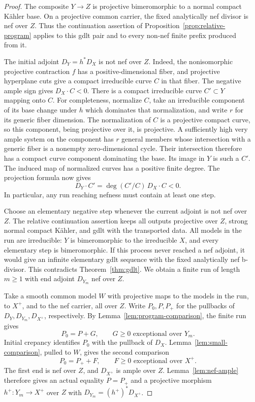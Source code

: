 \documentclass[11pt]{amsart}
\theoremstyle{definition}
\theoremstyle{remark}
\numberwithin{equation}{section}
\begin{document}
\begin{proof}
The composite \(Y\to Z\) is projective bimeromorphic to a normal compact
K\"ahler base.  On a projective common carrier, the fixed analytically nef
divisor is nef over \(Z\).  Thus the continuation assertion of
Proposition~\ref{prop:relative-program} applies to this gdlt pair and to
every non-nef finite prefix produced from it.

The initial adjoint \(D_Y=h^*D_X\) is not nef over \(Z\).  Indeed, the
nonisomorphic projective contraction \(f\) has a positive-dimensional
fiber, and projective hyperplane cuts give a compact irreducible curve
\(C\) in that fiber.  The negative ample sign gives \(D_X\cdot C<0\).
There is a compact irreducible curve \(C'\subset Y\) mapping onto \(C\).
For completeness, normalize \(C\), take an irreducible component of its
base change under \(h\) which dominates that normalization, and write
\(r\) for its generic fiber dimension.  The normalization of \(C\) is a
projective compact curve, so this component, being projective over it, is
projective.  A sufficiently high very ample system on the component has
\(r\) general members whose intersection with a generic fiber is a
nonempty zero-dimensional cycle.  Their intersection therefore has a
compact curve component dominating the base.  Its image in \(Y\) is such
a \(C'\).  The induced map of normalized curves has a positive finite
degree.  The projection formula now gives
\[
 D_Y\cdot C'=\deg(C'/C)\,D_X\cdot C<0.
\]
In particular, any run reaching nefness must contain at least one step.

Choose an elementary negative step whenever the current adjoint is not
nef over \(Z\).  The relative continuation assertion keeps all outputs
projective over \(Z\), strong normal compact K\"ahler, and gdlt with the
transported data.  All models in the run are irreducible: \(Y\) is
bimeromorphic to the irreducible \(X\), and every elementary step is
bimeromorphic.  If this process never reached a nef adjoint, it would
give an infinite elementary gdlt sequence with the fixed analytically nef
b-divisor.  This contradicts Theorem~\ref{thm:gdlt}.  We obtain a finite
run of length \(m\geq1\) with end adjoint \(D_{Y_m}\) nef over \(Z\).

Take a smooth common model \(W\) with projective maps to the models in the
run, to \(X^+\), and to the nef carrier, all over \(Z\).  Write \(P_0,P,P_+\) for the pullbacks
of \(D_Y,D_{Y_m},D_{X^+}\), respectively.  By
Lemma~\ref{lem:program-comparison}, the finite run gives
\[
 P_0=P+G,\qquad G\geq0\text{ exceptional over }Y_m.
\]
Initial crepancy identifies \(P_0\) with the pullback of \(D_X\).
Lemma~\ref{lem:small-comparison}, pulled to \(W\), gives the second
comparison
\[
 P_0=P_++F,\qquad F\geq0\text{ exceptional over }X^+.
\]
The first end is nef over \(Z\), and \(D_{X^+}\) is ample over \(Z\).
Lemma~\ref{lem:nef-ample} therefore gives an actual equality \(P=P_+\)
and a projective morphism \(h^+:Y_m\to X^+\) over \(Z\) with
\(D_{Y_m}=(h^+)^*D_{X^+}\).


\end{proof}
\end{document}
